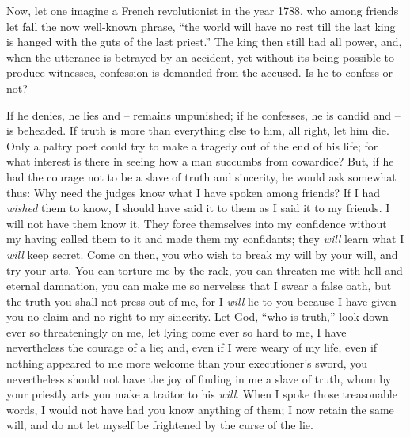 Now, let one imagine a French revolutionist in the year 1788, who among 
friends let fall the now well-known phrase, ``the world will have no rest 
till the last king is hanged with the guts of the last priest.'' The king 
then still had all power, and, when the utterance is betrayed by an accident, 
yet without its being possible to produce witnesses, confession is demanded 
from the accused. Is he to confess or not?

If he denies, he lies and -- remains unpunished; if he confesses, he is candid 
and -- is beheaded. If truth is more than everything else to him, all right, 
let him die. Only a paltry poet could try to make a tragedy out of the end of 
his life; for what interest is there in seeing how a man succumbs from 
cowardice? But, if he had the courage not to be a slave of truth and 
sincerity, he would ask somewhat thus: Why need the judges know what I have 
spoken among friends? If I had \textit{wished} them to know, I should have 
said it to them as I said it to my friends. I will not have them know it. They 
force themselves into my confidence without my having called them to it and 
made them my confidants; they \textit{will} learn what I \textit{will} keep 
secret. Come on then, you who wish to break my will by your will, and try your 
arts. You can torture me by the rack, you can threaten me with hell and 
eternal damnation, you can make me so nerveless that I swear a false oath, but 
the truth you shall not press out of me, for I \textit{will} lie to you 
because I have given you no claim and no right to my sincerity. Let God, 
``who is truth,'' look down ever so threateningly on me, let lying come ever 
so hard to me, I have nevertheless the courage of a lie; and, even if I were 
weary of my life, even if nothing appeared to me more welcome than your 
executioner's sword, you nevertheless should not have the joy of finding in me 
a slave of truth, whom by your priestly arts you make a traitor to his 
\textit{will}. When I spoke those treasonable words, I would not have had you 
know anything of them; I now retain the same will, and do not let myself be 
frightened by the curse of the lie.

